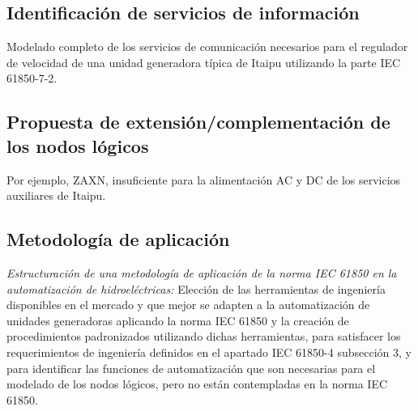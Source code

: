 	\subsection{Identificaci\'on de servicios de informaci\'on}
		Modelado completo de los servicios de comunicaci\'on necesarios para el
		regulador de velocidad de una unidad generadora t\'ipica de Itaipu
		utilizando la parte IEC 61850-7-2.
	\subsection{Propuesta de extensi\'on/complementaci\'on de los nodos l\'ogicos}
		Por ejemplo, ZAXN, insuficiente para la alimentaci\'on AC y DC de los
		servicios auxiliares de Itaipu.
	\subsection{Metodolog\'ia de aplicaci\'on }
		\emph{Estructuraci\'on de una metodolog\'ia de aplicaci\'on de la norma
		IEC 61850 en la automatizaci\'on de hidroel\'ectricas:} Elecci\'on de las
		herramientas de ingenier\'ia disponibles en el mercado y que mejor se adapten
		a la automatizaci\'on de unidades generadoras aplicando la norma IEC 61850 y
		la creaci\'on de procedimientos padronizados utilizando dichas herramientas,
		para satisfacer los requerimientos de ingenier\'ia definidos en el apartado
		IEC 61850-4 subsecci\'on 3, y para identificar las funciones de
		automatizaci\'on que son necesarias para el modelado de los nodos l\'ogicos,
		pero no est\'an contempladas en la norma IEC 61850.
